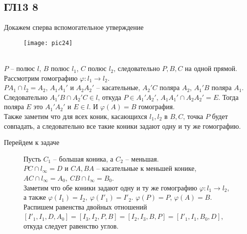 \newpage
\subsection*{ГЛ13 8}
\noindent
Докажем сперва вспомогательное утверждение\\
\begin{figure}[h]
	\texttt{[image: pic24]}
\end{figure}\\
$P$ -- полюс $l$, $B$ полюс $l_1$, $C$ полюс $l_2$, следовательно $P,B,C$ на одной прямой.\\
Рассмотрим гомографию $\varphi: l_1 \to l_2$.\\
$PA_1 \cap l_2 = A_2$, $A_1A_1'$ и $A_2A_2'$ -- касательные, $A_2'C$ поляра $A_2$, $A_1'B$ поляра $A_1$.\\
Следовательно $A_1'B \cap A_2'C \in l$, откуда $P \in A_1'A_2'$, $A_1A_1' \cap A_2A_2' = E$. Тогда поляра $E$ это $A_1'A_2'$ и $E \in l$. И $\varphi(A) = B$ гомография.\\
Также заметим что для всех коник, касающихся $l_1, l_2$ в $B,C$, точка $P$ будет совпадать, а следовательно все такие коники задают одну и ту же гомографию.

\vskip 0.2in
\noindent
Перейдем к задаче
\begin{figure}[h!]
	\begin{minipage}[h]{0.5\linewidth}
		Пусть $C_1$ -- большая коника, а $C_2$ -- меньшая.\\
		$PC \cap l_{\infty} = D$ и $CA,BA$ -- касательные к меньшей конике, $AC \cap l_{\infty} = A_0,\ CB \cap l_{\infty} = B_0$.\\
		Заметим что обе коники задают одну и ту же гомографию $\varphi: l_1 \to l_2$, а также $\varphi(I_1) = I_2,\ \varphi(I'_1) = I'_2$. $\varphi(P) = P$, $\varphi(A) = B$.\\
		Распишем равенства двойных отношений
		$[I'_1, I_1, D, A_0] = [I_3, I_2, P, B] = [I_2, I_3, B, P] = [I'_1, I_1, B_0, D]$, откуда следует равенство углов.
	\end{minipage}
	\hfill
	\begin{minipage}[h]{0.5\linewidth}
	\end{minipage}
\end{figure}